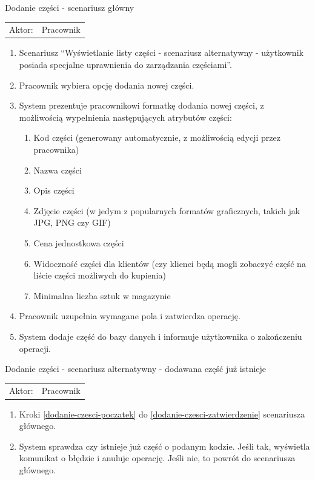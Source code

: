   \item Dodanie części - scenariusz główny \\
  \begin{tabularx}{\linewidth}{ c X}
  Aktor: & Pracownik \\
  \end{tabularx}
   \begin{enumerate}
    \item Scenariusz ``Wyświetlanie listy części - scenariusz alternatywny - użytkownik posiada specjalne uprawnienia do zarządzania częściami''. \label{dodanie-czesci-poczatek}
    \item Pracownik wybiera opcję dodania nowej części.
    \item System prezentuje pracownikowi formatkę dodania nowej części, z możliwością wypełnienia następujących atrybutów części:
    \begin{enumerate}
      \item Kod części (generowany automatycznie, z możliwością edycji przez pracownika)
      \item Nazwa części
      \item Opis części
      \item Zdjęcie części (w jedym z popularnych formatów graficznych, takich jak JPG, PNG czy GIF)
      \item Cena jednostkowa części
      \item Widoczność części dla klientów (czy klienci będą mogli zobaczyć część na liście części możliwych do kupienia)
      \item Minimalna liczba sztuk w magazynie
    \end{enumerate}
    \item Pracownik uzupełnia wymagane pola i zatwierdza operację. \label{dodanie-czesci-zatwierdzenie}
    \item System dodaje część do bazy danych i informuje użytkownika o zakończeniu operacji.
  \end{enumerate}
  
  \item Dodanie części - scenariusz alternatywny - dodawana część już istnieje \\
  \begin{tabularx}{\linewidth}{ c X}
  Aktor: & Pracownik \\
  \end{tabularx}
   \begin{enumerate}
    \item Kroki \ref{dodanie-czesci-poczatek} do \ref{dodanie-czesci-zatwierdzenie} scenariusza głównego.
    \item System sprawdza czy istnieje już część o podanym kodzie. Jeśli tak, wyświetla komunikat o błędzie i anuluje operację. Jeśli nie, to powrót do scenariusza głównego.
  \end{enumerate}
  
